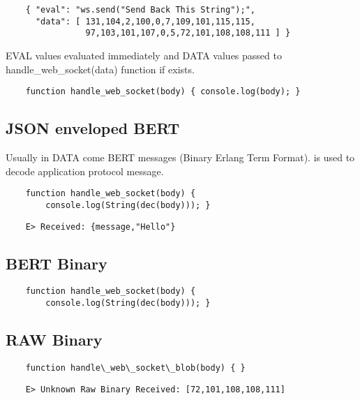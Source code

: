 \begin{lstlisting}
    { "eval": "ws.send("Send Back This String");",
      "data": [ 131,104,2,100,0,7,109,101,115,115,
                97,103,101,107,0,5,72,101,108,108,111 ] }
\end{lstlisting}

EVAL values evaluated immediately and DATA values passed
to handle\_web\_socket(data) function if exists.

\begin{lstlisting}
    function handle_web_socket(body) { console.log(body); }
\end{lstlisting}

\subsection{JSON enveloped BERT}

Usually in DATA come BERT messages (Binary Erlang Term Format).
is used to decode application protocol message.

\begin{lstlisting}
    function handle_web_socket(body) {
        console.log(String(dec(body))); }
\end{lstlisting}

\begin{lstlisting}
    E> Received: {message,"Hello"}
\end{lstlisting}

\subsection{BERT Binary}

\begin{lstlisting}
    function handle_web_socket(body) {
        console.log(String(dec(body))); }
\end{lstlisting}

\subsection{RAW Binary}

\begin{lstlisting}
    function handle\_web\_socket\_blob(body) { }
\end{lstlisting}

\begin{lstlisting}
    E> Unknown Raw Binary Received: [72,101,108,108,111]
\end{lstlisting}
